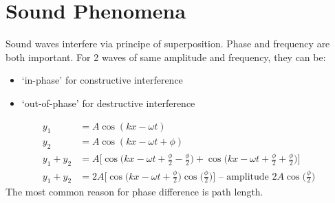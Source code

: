 \documentclass[a4paper, 11pt, normalem]{report}
\begin{document}
\section{Sound Phenomena}
Sound waves interfere via principe of superposition.
Phase and frequency are both important.
For 2 waves of same amplitude and frequency, they can be: 
\begin{itemize}
    \item `in-phase' for constructive interference
    \item `out-of-phase' for destructive interference
\end{itemize}
\begin{align}
    y_{1} &= A\cos{(kx - \omega t)} \\
    y_{2} &= A\cos{(kx - \omega t + \phi)}\\
    y_{1} + y_{2} &= A\Big[\cos{\Big(kx - \omega t + \frac{\phi}{2} - \frac{\phi}{2}\Big)} + \cos{\Big(kx - \omega t + \frac{\phi}{2} + \frac{\phi}{2}\Big)}\Big] \\
    y_{1} + y_{2} &= 2A\Big[\cos{\Big(kx - \omega t + \frac{\phi}{2}\Big)}\cos{\Big(\frac{\phi}{2}\Big)}\Big]\text{ -- amplitude }2A\cos{\Big(\frac{\phi}{2}\Big)}
\end{align}
The most common reason for phase difference is path length.
\end{document}
